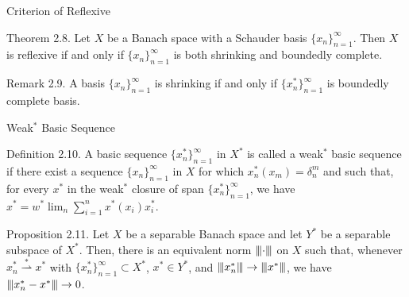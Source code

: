 \documentclass{beamer}
\newcommand{\xn}{\{x_n\}_{n=1}^\infty}
\newcommand{\xns}{\{x_n^*\}_{n=1}^\infty}
\newcommand{\wsconverge}{\mathop{\rightharpoonup}\limits^{*}}
\begin{document}
\begin{frame}{Criterion of Reflexive}
    \begin{block}{Theorem 2.8.}
        Let $X$ be a Banach space with a Schauder basis $\xn$. Then $X$ is reflexive if and only if $\xn$ is both shrinking and boundedly complete.
    \end{block}
    \begin{block}{Remark 2.9.}
         A basis $\xn$ is shrinking if and only if $\xns$ is boundedly complete basis.
    \end{block}
\end{frame}
\begin{frame}{Weak${}^*$ Basic Sequence}
    \begin{block}{Definition 2.10.}
        A basic sequence $\xns$ in $X^*$ is called a weak$^*$ basic sequence if there exist a sequence $\xn$ in $X$ for which $x_n^*(x_m)=\delta_n^m$ and such that, for every $x^*$ in the weak$^*$ closure of span $\xns$, we have
    $x^*=w^*\lim_n \sum_{i=1}^n x^*(x_i)x_i^*$.
    \end{block}
    \begin{block}{Proposition 2.11.}
        Let $X$ be a separable Banach space and let $Y^*$ be a separable subspace of $X^*$. Then, there is an equivalent norm $\left\lvert\kern-0.25ex\left\lvert\kern-0.25ex\left\lvert \cdot \right\rvert\kern-0.25ex\right\rvert\kern-0.25ex\right\rvert$ on $X$ such that, whenever $x_n^* \wsconverge x^*$ with $\xns \subset X^*$, $x^* \in Y^*$, and $\left\lvert\kern-0.25ex\left\lvert\kern-0.25ex\left\lvert x_n^* \right\rvert\kern-0.25ex\right\rvert\kern-0.25ex\right\rvert \to \left\lvert\kern-0.25ex\left\lvert\kern-0.25ex\left\lvert x^* \right\rvert\kern-0.25ex\right\rvert\kern-0.25ex\right\rvert$, we have $\left\lvert\kern-0.25ex\left\lvert\kern-0.25ex\left\lvert x_n^*-x^* \right\rvert\kern-0.25ex\right\rvert\kern-0.25ex\right\rvert \to 0$.
    \end{block}
\end{frame}
\end{document}
